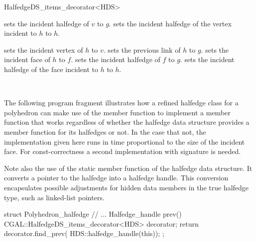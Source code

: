 \begin{ccRefClass}{HalfedgeDS_items_decorator<HDS>}

    {sets the incident halfedge of $v$ to $g$.}
\ccGlue
{}
    {sets the incident halfedge of the vertex incident to $h$ to $h$.}

    {sets the incident vertex of $h$ to $v$.}
\ccGlue
{}
    {sets the previous link of $h$ to $g$.}
\ccGlue
{}
    {sets the incident face of $h$ to $f$.}
\ccGlue
{}
    {sets the incident halfedge of $f$ to $g$.}
\ccGlue
{}
    {sets the incident halfedge of the face incident to $h$ to $h$.}


\ccSeeAlso

\\

\ccExample

The following program fragment illustrates how a refined halfedge
class for a polyhedron can make use of the  member
function to implement a  member function that works
regardless of whether the halfedge data structure  provides a
 member function for its halfedges or not. In the case that not,
the implementation given here runs in time proportional to the size of the 
incident face. For const-correctness a second implementation with signature
 is needed.

Note also the use of the static member function 
of the halfedge data structure. It converts a pointer to the halfedge
into a halfedge handle. This conversion encapsulates possible
adjustments for hidden data members in the true halfedge type, such as
linked-list pointers.

\begin{ccExampleCode}
struct Polyhedron_halfedge {
    // ...
    Halfedge_handle  prev() {
        CGAL::HalfedgeDS_items_decorator<HDS> decorator;
        return decorator.find_prev( HDS::halfedge_handle(this));
    }
};
\end{ccExampleCode}


\end{ccRefClass}

\ccRefPageEnd

